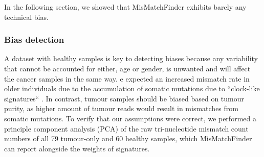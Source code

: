In the following section, we showed that MisMatchFinder exhibits barely any technical bias.

\subsubsection{Bias detection}
\label{mmf-sec:healthyBias}
A dataset with healthy samples is key to detecting biases because any variability that cannot be accounted for either, age or gender, is unwanted and will affect the cancer samples in the same way. e expected an increased mismatch rate in  older individuals due to the accumulation of somatic mutations due to ``clock-like signatures`` \cite{Abascal2021}. In contrast, tumour samples should be biased based on tumour purity, as higher amount of tumour reads would result in  mismatches from somatic mutations.
To verify that our assumptions were correct, we performed a principle component analysis (PCA) of the raw tri-nucleotide mismatch count numbers of all 79 tumour-only and 60 healthy samples, which MisMatchFinder can report alongside the weights of signatures.

